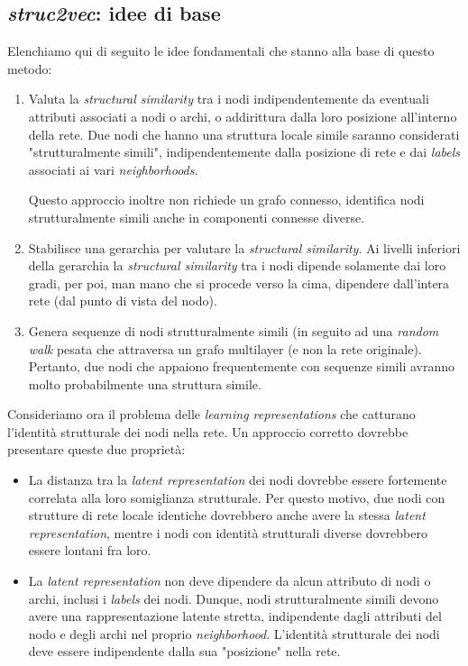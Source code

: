 \documentclass[11pt]{article}
\begin{document}
\subsection{\textit{struc2vec}: idee di base}
Elenchiamo qui di seguito le idee fondamentali che stanno alla base di questo metodo:
\begin{enumerate}
\setlength{\itemsep}{1pt}
  \setlength{\parskip}{0pt}
  \setlength{\parsep}{0pt}
  \item Valuta la \textit{structural similarity} tra i nodi indipendentemente da eventuali attributi associati a nodi o archi, o addirittura dalla loro posizione all'interno della rete. Due nodi che hanno una struttura locale simile saranno considerati "strutturalmente simili", indipendentemente dalla posizione di rete e dai \textit{labels} associati ai vari \textit{neighborhoods}.
  
Questo approccio inoltre non richiede un grafo connesso, identifica nodi strutturalmente simili anche in componenti connesse diverse.
  \item Stabilisce una gerarchia per valutare la \textit{structural similarity}.
Ai livelli inferiori della gerarchia la \textit{structural similarity} tra i nodi dipende solamente dai loro gradi, per poi, man mano che si procede verso la cima, dipendere dall'intera rete (dal punto di vista del nodo).
  \item Genera sequenze di nodi strutturalmente simili  (in seguito ad una \textit{random walk} pesata che attraversa un grafo multilayer (e non la rete originale). Pertanto, due nodi che appaiono frequentemente con sequenze simili avranno molto probabilmente una struttura simile.
\end{enumerate}

Consideriamo ora il problema delle \textit{learning representations} che catturano l'identità strutturale dei nodi nella rete. Un approccio corretto dovrebbe presentare queste due proprietà:
\begin{itemize}
\setlength{\itemsep}{1pt}
  \setlength{\parskip}{0pt}
  \setlength{\parsep}{0pt}
  \item La distanza tra la \textit{latent representation} dei nodi dovrebbe essere fortemente correlata alla loro somiglianza strutturale. Per questo motivo, due nodi con strutture di rete locale identiche dovrebbero anche avere la stessa \textit{latent representation}, mentre i nodi con identità strutturali diverse dovrebbero essere lontani fra loro.
  \item La \textit{latent representation} non deve dipendere da alcun attributo di nodi o archi, inclusi i \textit{labels} dei nodi. Dunque, nodi strutturalmente simili devono avere una rappresentazione latente stretta, indipendente dagli attributi del nodo e degli archi nel proprio \textit{neighborhood}.
L'identità strutturale dei nodi deve essere indipendente dalla sua "posizione" nella rete.
\end{itemize}
\end{document}
